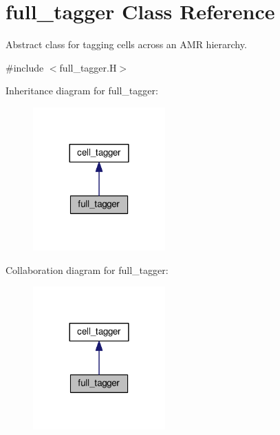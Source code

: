 \hypertarget{classfull__tagger}{}\section{full\+\_\+tagger Class Reference}
\label{classfull__tagger}


Abstract class for tagging cells across an A\+MR hierarchy.  




{\ttfamily \#include $<$full\+\_\+tagger.\+H$>$}



Inheritance diagram for full\+\_\+tagger\+:\nopagebreak
\begin{figure}[H]
\begin{center}
\leavevmode
\includegraphics[width=144pt]{classfull__tagger__inherit__graph}
\end{center}
\end{figure}


Collaboration diagram for full\+\_\+tagger\+:\nopagebreak
\begin{figure}[H]
\begin{center}
\leavevmode
\includegraphics[width=144pt]{classfull__tagger__coll__graph}
\end{center}
\end{figure}
